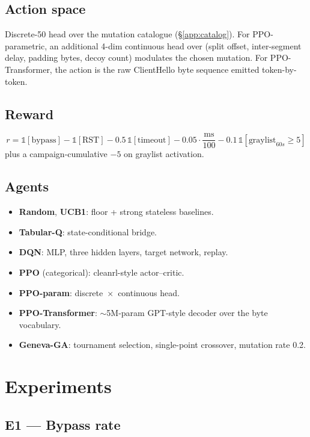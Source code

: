 \documentclass[letterpaper,twocolumn,10pt]{article}
\begin{document}
\subsection{Action space}
Discrete-50 head over the mutation catalogue (\S\ref{app:catalog}).
For PPO-parametric, an additional 4-dim continuous head over
(split offset, inter-segment delay, padding bytes, decoy count)
modulates the chosen mutation. For PPO-Transformer, the action is the
raw ClientHello byte sequence emitted token-by-token.

\subsection{Reward}
\[
r = \mathbb{1}[\text{bypass}] - \mathbb{1}[\text{RST}] - 0.5\,\mathbb{1}[\text{timeout}] - 0.05 \cdot \frac{\text{ms}}{100} - 0.1\,\mathbb{1}[\text{graylist}_{60s}\geq 5]
\]
plus a campaign-cumulative $-5$ on graylist activation.

\subsection{Agents}
\begin{itemize}
\item \textbf{Random}, \textbf{UCB1}: floor + strong stateless baselines.
\item \textbf{Tabular-Q}: state-conditional bridge.
\item \textbf{DQN}: MLP, three hidden layers, target network, replay.
\item \textbf{PPO} (categorical): cleanrl-style actor–critic.
\item \textbf{PPO-param}: discrete~$\times$~continuous head.
\item \textbf{PPO-Transformer}: $\sim$5M-param GPT-style decoder over
the byte vocabulary.
\item \textbf{Geneva-GA}: tournament selection, single-point crossover,
mutation rate 0.2.
\end{itemize}

\section{Experiments}
\label{sec:expts}

\subsection{E1 — Bypass rate}
\label{sec:e1}
\end{document}
